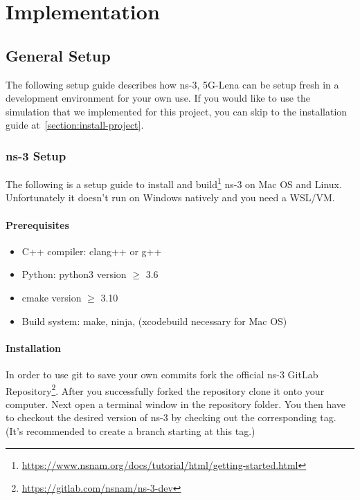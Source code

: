 
\chapter{Implementation}
\label{chapter:implementation}
\section{General Setup}

The following setup guide describes how ns-3, 5G-Lena can be setup fresh in a development environment for your own use. If you would like to use the simulation that we implemented for this project, you can skip to the installation guide at~\ref{section:install-project}.

\subsection{ns-3 Setup}

The following is a setup guide to install and build\footnote[1]{\url{https://www.nsnam.org/docs/tutorial/html/getting-started.html}} ns-3 on Mac OS and Linux. Unfortunately it doesn't run on Windows natively and you need a WSL/VM. 

\subsubsection{Prerequisites}
\begin{itemize}
    \item C++ compiler: clang++ or g++
    \item Python: python3 version $\geq$ 3.6
    \item cmake version $\geq$ 3.10
    \item Build system: make, ninja, (xcodebuild necessary for Mac OS)
\end{itemize}

\subsubsection{Installation}

In order to use git to save your own commits fork the official ns-3 GitLab Repository\footnote[2]{\url{https://gitlab.com/nsnam/ns-3-dev}}. After you successfully forked the repository clone it onto your computer. Next open a terminal window in the repository folder. You then have to checkout the desired version of ns-3 by checking out the corresponding tag. (It's recommended to create a branch starting at this tag.) 


